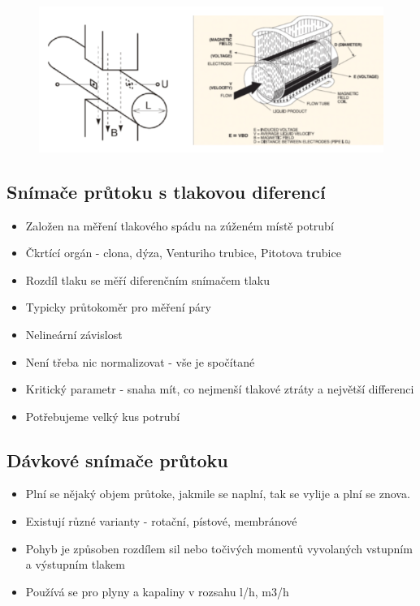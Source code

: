 \begin{figure}[h]
    \centering
    \includegraphics[scale = 1]{img/indukceViiir.png}
\end{figure}

\subsection*{Snímače průtoku s tlakovou diferencí}
\begin{itemize}
    \item Založen na měření tlakového spádu na zúženém místě potrubí
    \item Čkrtící orgán - clona, dýza, Venturiho trubice, Pitotova trubice
    \item Rozdíl tlaku se měří diferenčním snímačem tlaku
    \item Typicky průtokoměr pro měření páry
    \item Nelineární závislost
    \item Není třeba nic normalizovat - vše je spočítané
    \item Kritický parametr - snaha mít, co nejmenší tlakové ztráty a největší differenci
    \item Potřebujeme velký kus potrubí
\end{itemize}

\subsection*{Dávkové snímače průtoku}
\begin{itemize}
    \item Plní se nějaký objem průtoke, jakmile se naplní, tak se vylije a plní se znova.
    \item Existují různé varianty - rotační, pístové, membránové
    \item Pohyb je způsoben rozdílem sil nebo točivých momentů vyvolaných vstupním a výstupním tlakem
    \item Používá se pro plyny a kapaliny v rozsahu l/h, m3/h
\end{itemize}

